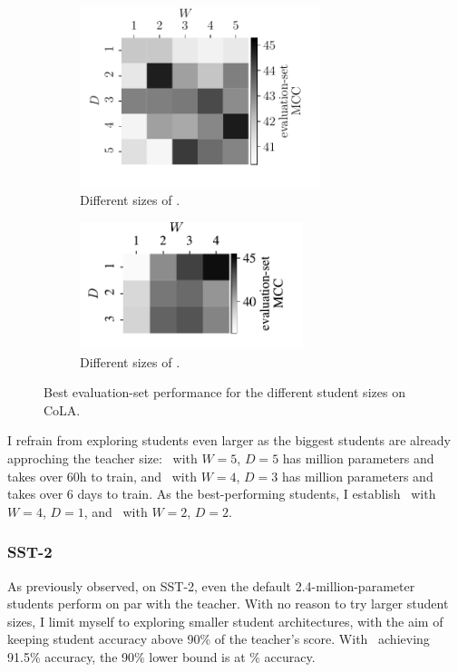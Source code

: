 {{{      \begin{figure}
        \centering
        \begin{subfigure}{.5\textwidth}
          \centering
          \includegraphics[width=7cm]{../experiments/analysis/img/size-cola-lstm-map}
          \caption{Different sizes of \LSTMS.}
          \label{fig:size-cola-lstm}
        \end{subfigure}%
        \begin{subfigure}{.5\textwidth}
          \centering
          \includegraphics[width=6.5cm]{../experiments/analysis/img/size-cola-bert-map}
          \caption{Different sizes of \BERTS.}
          \label{fig:size-cola-bert}
        \end{subfigure}
        \caption{Best evaluation-set performance for the different student sizes on CoLA.}
        \label{fig:size-cola}
      \end{figure}
      
      I refrain from exploring students even larger as the biggest students are already approching the teacher size: \LSTMS~with $W=5$, $D=5$ has  million parameters and takes over 60h to train, and \BERTS~with $W=4$, $D=3$ has  million parameters and takes over 6 days to train.
      As the best-performing students, I establish \BERTS~with $W=4$, $D=1$, and \LSTMS~with $W=2$, $D=2$.
    }

    \subsubsection{SST-2}{
      As previously observed, on SST-2, even the default 2.4-million-parameter students perform on par with the teacher. With no reason to try larger student sizes, I limit myself to exploring smaller student architectures, with the aim of keeping student accuracy above 90\% of the teacher's score. With \BERTT~achieving 91.5\% accuracy, the 90\% lower bound is at \% accuracy.

}}}
